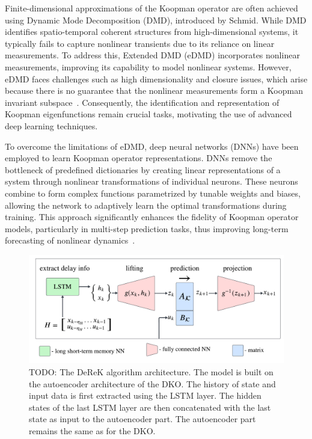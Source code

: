 \documentclass[conference]{IEEEtran}
\newcommand{\todo}[1]{{{\color{red} TODO: #1	}} }
\begin{document}
Finite-dimensional approximations of the Koopman operator are often achieved using Dynamic Mode Decomposition (DMD), introduced by Schmid. While DMD identifies spatio-temporal coherent structures from high-dimensional systems, it typically fails to capture nonlinear transients due to its reliance on linear measurements. To address this, Extended DMD (eDMD) incorporates nonlinear measurements, improving its capability to model nonlinear systems. However, eDMD faces challenges such as high dimensionality and closure issues, which arise because there is no guarantee that the nonlinear measurements form a Koopman invariant subspace~\cite{Lusch2018}. Consequently, the identification and representation of Koopman eigenfunctions remain crucial tasks, motivating the use of advanced deep learning techniques.

To overcome the limitations of eDMD, deep neural networks (DNNs) have been employed to learn Koopman operator representations. DNNs remove the bottleneck of predefined dictionaries by creating linear representations of a system through nonlinear transformations of individual neurons. These neurons combine to form complex functions parametrized by tunable weights and biases, allowing the network to adaptively learn the optimal transformations during training. This approach significantly enhances the fidelity of Koopman operator models, particularly in multi-step prediction tasks, thus improving long-term forecasting of nonlinear dynamics~\cite{Yeung2019}.
\begin{figure}
	\centering
	\includegraphics[width = \linewidth]{figures/derek_scheme.pdf}
	\caption{\todo{The DeReK algorithm architecture. The model is built on the autoencoder architecture of the DKO. The history of state and input data is first extracted using the LSTM layer. The hidden states of the last LSTM layer are then concatenated with the last state as input to the autoencoder part. The autoencoder part remains the same as for the DKO.}}
	\label{fig:derek_scheme}
\end{figure}
\end{document}
